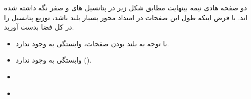 \begin{ELexample}{}

دو صفحه هادی نیمه بینهایت مطابق شکل زیر در پتانسیل های  و صفر نگه داشته شده اند. با فرض اینکه طول این صفحات در امتداد محور  بسیار بلند باشد، توزیع پتانسیل را در کل فضا بدست آورید.


\begin{ELsolution}

\begin{itemize}
\tightlist
\item
  با توجه به بلند بودن صفحات، وابستگی به  وجود ندارد.
\item
  وابستگی به  وجود ندارد ().
\end{itemize}


\begin{itemize}
\tightlist
\item
  \ELim{0\leq\phi\leq\alpha}
\end{itemize}


\begin{itemize}
\tightlist
\item
\end{itemize}


\end{ELsolution}

\end{ELexample}


